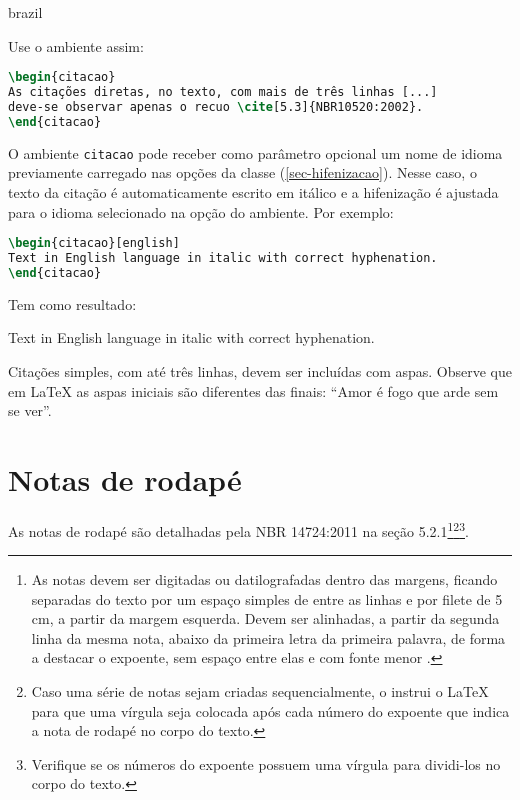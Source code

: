 \begin{otherlanguage*}{brazil}
\begin{citacao}
 
\end{citacao}

 
Use o ambiente assim:

\begin{lstlisting}[language=tex]
\begin{citacao}
As citações diretas, no texto, com mais de três linhas [...]
deve-se observar apenas o recuo \cite[5.3]{NBR10520:2002}.
\end{citacao}
\end{lstlisting}

 

O ambiente \texttt{citacao} pode receber como parâmetro opcional um nome de
idioma previamente carregado nas opções da classe (\autoref{sec-hifenizacao}). Nesse
caso, o texto da citação é automaticamente escrito em itálico e a hifenização é
ajustada para o idioma selecionado na opção do ambiente. Por exemplo:

\begin{lstlisting}[language=tex]
\begin{citacao}[english]
Text in English language in italic with correct hyphenation.
\end{citacao}
\end{lstlisting}

Tem como resultado:

\begin{citacao}[english]
Text in English language in italic with correct hyphenation.
\end{citacao}

Citações simples, com até três linhas, devem ser
incluídas com aspas. Observe que em \LaTeX{} as aspas iniciais são diferentes das
finais: ``Amor é fogo que arde sem se ver''.

\section{Notas de rodapé}

As notas de rodapé são detalhadas pela NBR 14724:2011 na seção 5.2.1\footnote{As
notas devem ser digitadas ou datilografadas dentro das margens, ficando
separadas do texto por um espaço simples de entre as linhas e por filete de 5
cm, a partir da margem esquerda. Devem ser alinhadas, a partir da segunda linha
da mesma nota, abaixo da primeira letra da primeira palavra, de forma a destacar
o expoente, sem espaço entre elas e com fonte menor
.}\footnote{Caso uma série de notas sejam
criadas sequencialmente, o \abnTeX{} instrui o \LaTeX{} para que uma vírgula seja
colocada após cada número do expoente que indica a nota de rodapé no corpo do
texto.}\footnote{Verifique se os números do expoente possuem uma vírgula para
dividi-los no corpo do texto.}.



\end{otherlanguage*}
